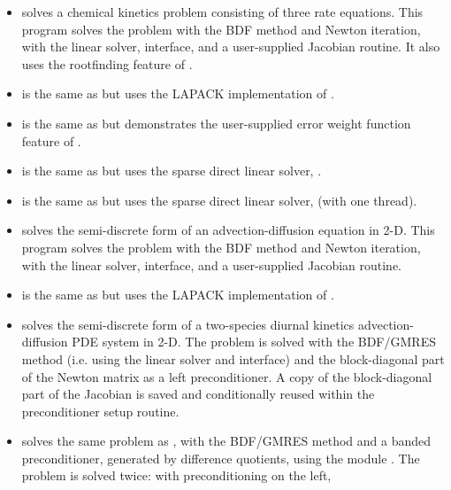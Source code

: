 \begin{itemize}
\item {}
  solves a chemical kinetics problem consisting of three rate equations.
  \newline
  This program solves the problem with the BDF method and Newton
  iteration, with the {\sunlinsoldense} linear solver, {\cvdls}
  interface, and a user-supplied Jacobian routine.  It also uses the
  rootfinding feature of {\cvode}.
\item {}
  is the same as  but uses the LAPACK
  implementation of {\sunlinsollapdense}.
\item {}
  is the same as  but demonstrates the user-supplied error
  weight function feature of {\cvode}.
\item {}
  is the same as  but uses the {\klu} sparse direct
  linear solver, {\sunlinsolklu}.
\item {}
  is the same as  but uses the {\superlumt} sparse
  direct linear solver, {\sunlinsolslumt} (with one thread).
\item {}
  solves the semi-discrete form of an advection-diffusion equation in 2-D.
  \newline
  This program solves the problem with the BDF method and Newton
  iteration, with the {\sunlinsolband} linear solver, {\cvdls}
  interface, and a user-supplied Jacobian routine.
\item {}
  is the same as  but uses the LAPACK
  implementation of {\sunlinsollapband}.
\item {}
  solves the semi-discrete form of a two-species diurnal kinetics
  advection-diffusion PDE system in 2-D.
  \newline
  The problem is solved with the BDF/GMRES method (i.e.
  using the {\sunlinsolspgmr} linear solver and {\cvspils} interface)
  and the block-diagonal part of the Newton matrix as a left
  preconditioner. A copy of the block-diagonal part of the Jacobian is
  saved and conditionally reused within the preconditioner setup routine.
\item {}
  solves the same problem as , with the BDF/GMRES method
  and a banded preconditioner, generated by difference quotients,
  using the module {\cvbandpre}.
  \newline
  The problem is solved twice: with preconditioning on the left,

\end{itemize}
